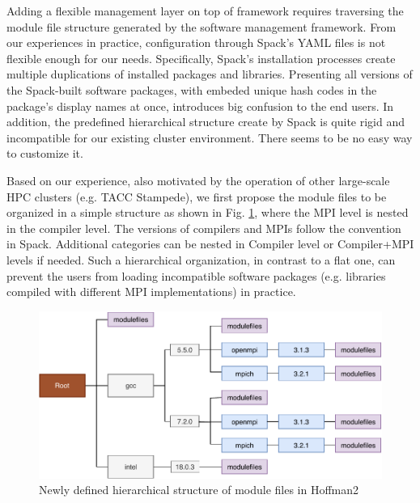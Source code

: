 \documentclass[conference]{IEEEtran}
\begin{document}
Adding a flexible management layer on top of framework requires traversing the module file structure generated by the software management framework.
From our experiences in practice, configuration through Spack's YAML files is not flexible enough for our needs.
Specifically, Spack's installation processes create multiple duplications of installed packages and libraries. Presenting all versions of the Spack-built software packages, with embeded unique hash codes in the package's display names at once, introduces big confusion to the end users.
In addition, the predefined hierarchical structure create by Spack is quite rigid and incompatible for our existing cluster environment. There seems to be no easy way to customize it. 

Based on our experience, also motivated by the operation of other large-scale HPC clusters (e.g. TACC Stampede), we first propose the module files to be organized in a simple structure as shown in Fig. \ref{fig:h2_new_hier}, where the MPI level is nested in the compiler level. 
The versions of compilers and MPIs follow the convention in Spack. 
Additional categories can be nested in Compiler level or Compiler+MPI levels if needed. Such a hierarchical organization, in contrast to a flat one, can prevent the users from loading incompatible software packages (e.g. libraries compiled with different MPI implementations) in practice.

\begin{figure}[htbp]
  \centerline{\includegraphics[width=\linewidth]{figures/h2_new_hier}}
  \caption{Newly defined hierarchical structure of module files in Hoffman2}
  \label{fig:h2_new_hier}
\end{figure}
\end{document}
